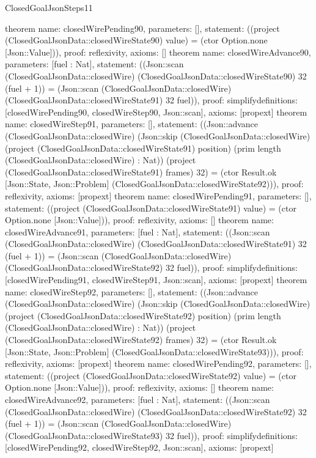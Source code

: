 \begin{lexlean}{ClosedGoalJsonSteps11}
\begin{semanticmodule}
{}
theorem{
 name: closedWirePending90, parameters: [],
 statement: ((project (ClosedGoalJsonData::closedWireState90) value) = (ctor Option.none [Json::Value])), proof: reflexivity{}, axioms: []
}
theorem{
 name: closedWireAdvance90, parameters: [fuel : Nat],
 statement: ((Json::scan (ClosedGoalJsonData::closedWire) (ClosedGoalJsonData::closedWireState90) 32 (fuel + 1)) = (Json::scan (ClosedGoalJsonData::closedWire) (ClosedGoalJsonData::closedWireState91) 32 fuel)), proof: simplify{definitions: [closedWirePending90, closedWireStep90, Json::scan]}, axioms: [propext]
}
theorem{
 name: closedWireStep91, parameters: [],
 statement: ((Json::advance (ClosedGoalJsonData::closedWire) (Json::skip (ClosedGoalJsonData::closedWire) (project (ClosedGoalJsonData::closedWireState91) position) (prim length (ClosedGoalJsonData::closedWire) : Nat)) (project (ClosedGoalJsonData::closedWireState91) frames) 32) = (ctor Result.ok [Json::State, Json::Problem] (ClosedGoalJsonData::closedWireState92))), proof: reflexivity{}, axioms: [propext]
}
theorem{
 name: closedWirePending91, parameters: [],
 statement: ((project (ClosedGoalJsonData::closedWireState91) value) = (ctor Option.none [Json::Value])), proof: reflexivity{}, axioms: []
}
theorem{
 name: closedWireAdvance91, parameters: [fuel : Nat],
 statement: ((Json::scan (ClosedGoalJsonData::closedWire) (ClosedGoalJsonData::closedWireState91) 32 (fuel + 1)) = (Json::scan (ClosedGoalJsonData::closedWire) (ClosedGoalJsonData::closedWireState92) 32 fuel)), proof: simplify{definitions: [closedWirePending91, closedWireStep91, Json::scan]}, axioms: [propext]
}
theorem{
 name: closedWireStep92, parameters: [],
 statement: ((Json::advance (ClosedGoalJsonData::closedWire) (Json::skip (ClosedGoalJsonData::closedWire) (project (ClosedGoalJsonData::closedWireState92) position) (prim length (ClosedGoalJsonData::closedWire) : Nat)) (project (ClosedGoalJsonData::closedWireState92) frames) 32) = (ctor Result.ok [Json::State, Json::Problem] (ClosedGoalJsonData::closedWireState93))), proof: reflexivity{}, axioms: [propext]
}
theorem{
 name: closedWirePending92, parameters: [],
 statement: ((project (ClosedGoalJsonData::closedWireState92) value) = (ctor Option.none [Json::Value])), proof: reflexivity{}, axioms: []
}
theorem{
 name: closedWireAdvance92, parameters: [fuel : Nat],
 statement: ((Json::scan (ClosedGoalJsonData::closedWire) (ClosedGoalJsonData::closedWireState92) 32 (fuel + 1)) = (Json::scan (ClosedGoalJsonData::closedWire) (ClosedGoalJsonData::closedWireState93) 32 fuel)), proof: simplify{definitions: [closedWirePending92, closedWireStep92, Json::scan]}, axioms: [propext]
}
\end{semanticmodule}
\end{lexlean}
